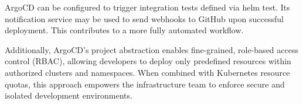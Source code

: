 ArgoCD can be configured to trigger integration tests defined via helm test.
Its notification service may be used to send webhooks to GitHub upon successful deployment.
This contributes to a more fully automated workflow.

Additionally, ArgoCD’s project abstraction enables fine-grained, role-based access control (RBAC), allowing developers to deploy only predefined resources within authorized clusters and namespaces.
When combined with Kubernetes resource quotas, this approach empowers the infrastructure team to enforce secure and isolated development environments.
